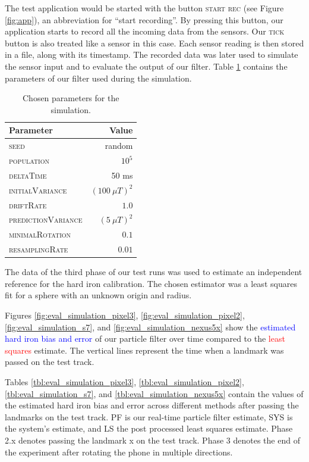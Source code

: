 The test application would be started with the button \textsc{start rec} (see Figure \ref{fig:app}), an abbreviation for ``start recording''. By pressing this button, our application starts to record all the incoming data from the sensors. Our \textsc{tick} button is also treated like a sensor in this case. Each sensor reading is then stored in a file, along with its timestamp. The recorded data was later used to simulate the sensor input and to evaluate the output of our filter. Table \ref{tbl:eval_params} contains the parameters of our filter used during the simulation.

\begin{table}[H]
    \centering
    \begin{tabular}{ | l | r | }
    \hline
    \textbf{Parameter}              & \textbf{Value} \\ \hline
    \textsc{seed}                   & random \\ \hline
    \textsc{population}             & $10^5$ \\ \hline
    \textsc{deltaTime}              & 50 ms \\ \hline
    \textsc{initialVariance}        & $(100\ \mu T)^2$ \\ \hline
    \textsc{driftRate}              & $1.0$ \\ \hline
    \textsc{predictionVariance}     & $(5\ \mu T)^2$ \\ \hline
    \textsc{minimalRotation}        & $0.1$ \\ \hline
    \textsc{resamplingRate}         & $0.01$ \\ \hline
    \end{tabular}
    \caption{Chosen parameters for the simulation.}
    \label{tbl:eval_params}
\end{table}

The data of the third phase of our test runs was used to estimate an independent reference for the hard iron calibration. The chosen estimator was a least squares fit for a sphere with an unknown origin and radius.\cite{Jekel2016} 

Figures \ref{fig:eval_simulation_pixel3}, \ref{fig:eval_simulation_pixel2}, \ref{fig:eval_simulation_s7}, and \ref{fig:eval_simulation_nexus5x} show the \textcolor{blue}{estimated hard iron bias and error} of our particle filter over time compared to the \textcolor{red}{least squares} estimate. The vertical lines represent the time when a landmark was passed on the test track.

Tables \ref{tbl:eval_simulation_pixel3}, \ref{tbl:eval_simulation_pixel2}, \ref{tbl:eval_simulation_s7}, and \ref{tbl:eval_simulation_nexus5x} contain the values of the estimated hard iron bias and error across different methods after passing the landmarks on the test track. \textsc{PF} is our real-time particle filter estimate, \textsc{SYS} is the system's estimate, and \textsc{LS} the post processed least squares estimate. Phase 2.x denotes passing the landmark x on the test track. Phase 3 denotes the end of the experiment after rotating the phone in multiple directions.

